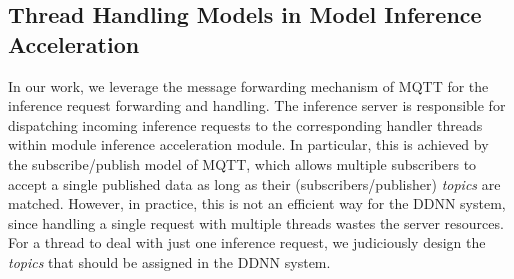 \documentclass[format=acmsmall, review=false, screen=true]{acmart}
\begin{document}
%


\subsection{Thread Handling Models in Model Inference Acceleration}
In our work, we leverage the message forwarding mechanism of MQTT for the inference request forwarding and handling. The inference server is responsible for dispatching incoming inference requests to the corresponding handler threads within module inference acceleration module. In particular, this is achieved by the subscribe/publish model of MQTT, which allows multiple subscribers to accept a single published data as long as their (subscribers/publisher) \emph{topics} are matched. However, in practice, this is not an efficient way for the DDNN system, since handling a single request with multiple threads wastes the server resources. For a thread to deal with just one inference request, we judiciously design the \emph{topics} that should be assigned in the DDNN system.
\end{document}
